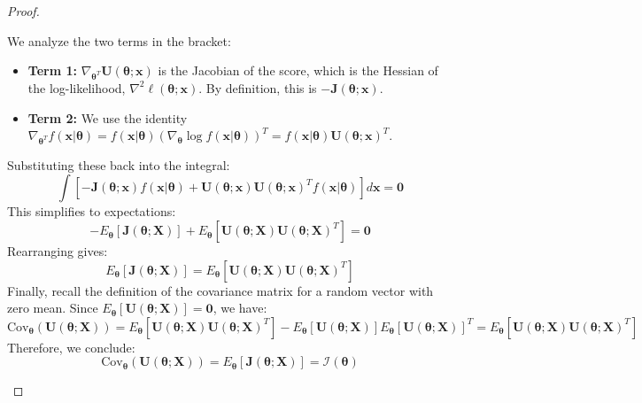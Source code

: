 \documentclass[
  letterpaper,
  DIV=11,
  numbers=noendperiod]{scrreprt}
\providecommand{\tightlist}{%
  \setlength{\itemsep}{0pt}\setlength{\parskip}{0pt}}
\renewcommand{\[}{\begin{equation}}
\renewcommand{\]}{\end{equation}}
\theoremstyle{definition}
\theoremstyle{plain}
\theoremstyle{plain}
\theoremstyle{plain}
\theoremstyle{definition}
\theoremstyle{plain}
\theoremstyle{remark}
\begin{document}
\begin{proof}
\begin{enumerate}
  We analyze the two terms in the bracket:

  \begin{itemize}
  \tightlist
  \item
    \textbf{Term 1:}
    \(\nabla_{\boldsymbol{\theta}^T} \mathbf{U}(\boldsymbol{\theta}; \mathbf{x})\)
    is the Jacobian of the score, which is the Hessian of the
    log-likelihood, \(\nabla^2 \ell(\boldsymbol{\theta}; \mathbf{x})\).
    By definition, this is
    \(-\mathbf{J}(\boldsymbol{\theta}; \mathbf{x})\).
  \item
    \textbf{Term 2:} We use the identity
    \(\nabla_{\boldsymbol{\theta}^T} f(\mathbf{x}|\boldsymbol{\theta}) = f(\mathbf{x}|\boldsymbol{\theta}) (\nabla_{\boldsymbol{\theta}} \log f(\mathbf{x}|\boldsymbol{\theta}))^T = f(\mathbf{x}|\boldsymbol{\theta}) \mathbf{U}(\boldsymbol{\theta}; \mathbf{x})^T\).
  \end{itemize}

  Substituting these back into the integral: \[
  \int \left[ -\mathbf{J}(\boldsymbol{\theta}; \mathbf{x}) f(\mathbf{x}|\boldsymbol{\theta}) + \mathbf{U}(\boldsymbol{\theta}; \mathbf{x}) \mathbf{U}(\boldsymbol{\theta}; \mathbf{x})^T f(\mathbf{x}|\boldsymbol{\theta}) \right] d\mathbf{x} = \mathbf{0}
  \] This simplifies to expectations: \[
  -E_{\boldsymbol{\theta}} [ \mathbf{J}(\boldsymbol{\theta}; \mathbf{X}) ] + E_{\boldsymbol{\theta}} [ \mathbf{U}(\boldsymbol{\theta}; \mathbf{X}) \mathbf{U}(\boldsymbol{\theta}; \mathbf{X})^T ] = \mathbf{0}
  \] Rearranging gives: \[
  E_{\boldsymbol{\theta}} [ \mathbf{J}(\boldsymbol{\theta}; \mathbf{X}) ] = E_{\boldsymbol{\theta}} [ \mathbf{U}(\boldsymbol{\theta}; \mathbf{X}) \mathbf{U}(\boldsymbol{\theta}; \mathbf{X})^T ]
  \] Finally, recall the definition of the covariance matrix for a
  random vector with zero mean. Since
  \(E_{\boldsymbol{\theta}}[\mathbf{U}(\boldsymbol{\theta}; \mathbf{X})] = \mathbf{0}\),
  we have: \[
  \text{Cov}_{\boldsymbol{\theta}}(\mathbf{U}(\boldsymbol{\theta}; \mathbf{X})) = E_{\boldsymbol{\theta}}[\mathbf{U}(\boldsymbol{\theta}; \mathbf{X})\mathbf{U}(\boldsymbol{\theta}; \mathbf{X})^T] - E_{\boldsymbol{\theta}}[\mathbf{U}(\boldsymbol{\theta}; \mathbf{X})]E_{\boldsymbol{\theta}}[\mathbf{U}(\boldsymbol{\theta}; \mathbf{X})]^T = E_{\boldsymbol{\theta}}[\mathbf{U}(\boldsymbol{\theta}; \mathbf{X})\mathbf{U}(\boldsymbol{\theta}; \mathbf{X})^T]
  \] Therefore, we conclude: \[
  \text{Cov}_{\boldsymbol{\theta}}(\mathbf{U}(\boldsymbol{\theta}; \mathbf{X}))=E_{\boldsymbol{\theta}} [ \mathbf{J}(\boldsymbol{\theta}; \mathbf{X}) ] = \mathcal{I}(\boldsymbol{\theta})
  \]
\end{enumerate}

\end{proof}
\end{document}
